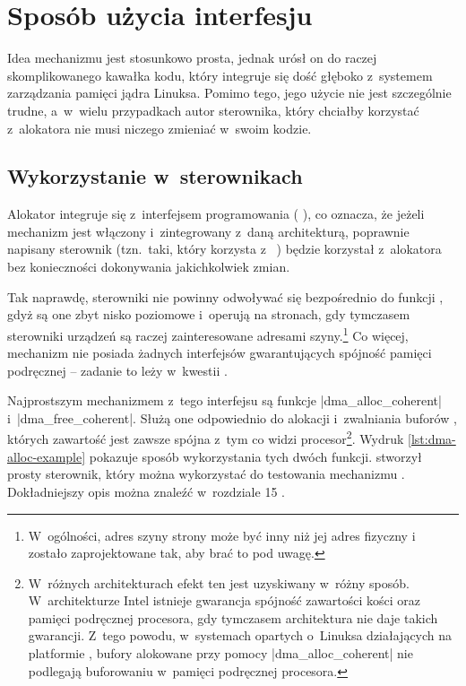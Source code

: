 \chapter{Sposób użycia interfesju }\label{sec:cma-usage}

Idea mechanizmu  jest stosunkowo prosta, jednak urósł on do raczej
skomplikowanego kawałka kodu, który integruje się dość głęboko
z~systemem zarządzania pamięci jądra Linuksa.  Pomimo tego, jego
użycie nie jest szczególnie trudne, a~w~wielu przypadkach autor
sterownika, który chciałby korzystać z~alokatora  nie musi niczego
zmieniać w~swoim kodzie.

\section{Wykorzystanie w~sterownikach}\label{sec:usage-drivers}

Alokator  integruje się z~interfejsem programowania  ( ),
co oznacza, że jeżeli mechanizm  jest włączony i~zintegrowany
z~daną architekturą, poprawnie napisany sterownik (tzn.\ taki, który
korzysta z~ ) będzie korzystał z~alokatora  bez konieczności
dokonywania jakichkolwiek zmian.

Tak naprawdę, sterowniki nie powinny odwoływać się bezpośrednio do
funkcji , gdyż są one zbyt nisko poziomowe i~operują na stronach,
gdy tymczasem sterowniki urządzeń są raczej zainteresowane adresami
szyny.\footnote{W~ogólności, adres szyny strony może być inny niż jej
  adres fizyczny i~  zostało zaprojektowane tak, aby brać to pod
  uwagę.}  Co więcej, mechanizm  nie posiada żadnych interfejsów
gwarantujących spójność pamięci podręcznej -- zadanie to leży
w~kwestii  .

Najprostszym mechanizmem z~tego interfejsu są funkcje
\code|dma_alloc_coherent| i~\code|dma_free_coherent|.  Służą one
odpowiednio do alokacji i~zwalniania buforów , których zawartość
jest zawsze spójna z~tym co widzi procesor\footnote{W~różnych
  architekturach efekt ten jest uzyskiwany w~różny sposób.
  W~architekturze Intel istnieje gwarancja spójność zawartości kości
   oraz pamięci podręcznej procesora, gdy tymczasem architektura
   nie daje takich gwarancji.  Z~tego powodu, w~systemach opartych
  o~Linuksa działających na platformie , bufory alokowane przy
  pomocy \code|dma_alloc_coherent| nie podlegają buforowaniu w~pamięci
  podręcznej procesora.}.  Wydruk \ref{lst:dma-alloc-example} pokazuje
sposób wykorzystania tych dwóch funkcji.  \textcite{patch:cma-test}
stworzył prosty sterownik, który można wykorzystać do testowania
mechanizmu .  Dokładniejszy opis   można znaleźć w~rozdziale
15 \autocite{bib:ldd3}.

